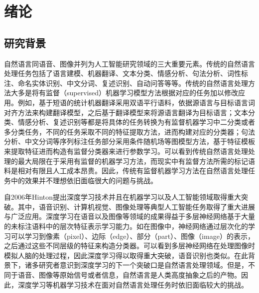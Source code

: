 \documentclass[master]{njuthesis}
\begin{document}
\tableofcontents

\listoffigures

\listoftables

\mainmatter


\chapter{绪论}\label{chapter1_introduction}
\section{研究背景}\label{sec_chap1_background}

自然语言同语音、图像并列为人工智能研究领域的三大重要元素。传统的自然语言处理任务包括了语言建模、机器翻译、文本分类、情感分析、句法分析、词性标注、命名实体识别、中文分词、复述识别、自动问答等等\cite{collobert2008unified}。传统的自然语言处理方法大多是将有监督（supervised）机器学习模型方法根据对应的任务加以修改应用。例如，基于短语的统计机器翻译采用双语平行语料，依据源语言与目标语言词对齐方法来构建翻译模型，之后基于翻译模型来将源语言翻译为目标语言\cite{chiang2005hierarchical}；文本分类、情感分析、复述识别等都是将具体的任务转换为有监督机器学习中二分类或者多分类任务，不同的任务采取不同的特征提取方法，进而构建对应的分类器\cite{collobert2008unified}；句法分析、中文分词等序列标注任务部分采用条件随机场等图模型方法，基于特征模板来提取特征进而构造有监督分类器来进行参数学习\cite{lafferty2001conditional,zhao2006improved}。可以看到传统自然语言处理处理的最大局限在于采用有监督的机器学习方法，而现实中有监督方法所需的标记语料是相对有限且人工成本昂贵。因此，传统有监督机器学习方法在自然语言处理任务中的效果并不理想依旧面临很大的问题与挑战。

自2006年Hinton提出深度学习技术\cite{hinton2006reducing}并且在机器学习以及人工智能领域取得重大突破。其中，语音识别、计算机视觉、图像处理等典型人工智能任务取得了重大进展与广泛应用。深度学习在语音以及图像等领域的成果得益于多层神经网络基于大量的未标注语料中的层次特征表示学习能力。如在图像中，神经网络通过层次化的学习可以学习到像素（pixel）、边际（edge）、部分（part）、图像（image）的表示，之后通过这些不同层级的特征来构造分类器\cite{lee2009convolutional}。可以看到多层神经网络在处理图像时模拟人脑的处理过程，因此深度学习得以取得重大突破，语音识别也类似\cite{lee2009unsupervised}。在此背景下，诸多研究者意识到深度学习的下一个突破口是自然语言处理领域。但是，不同于语音、图像等原始信号或者信息，自然语言是人类高度抽象之后的产物。因此，深度学习等机器学习技术在面对自然语言处理任务时依旧面临较大的挑战。
\end{document}
